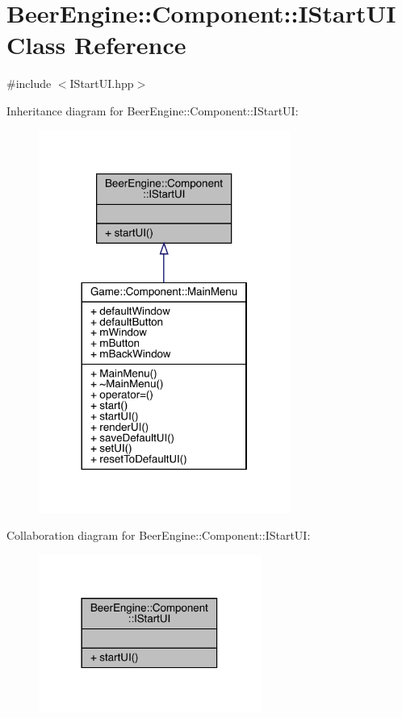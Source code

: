 \hypertarget{class_beer_engine_1_1_component_1_1_i_start_u_i}{}\section{Beer\+Engine\+:\+:Component\+:\+:I\+Start\+UI Class Reference}
\label{class_beer_engine_1_1_component_1_1_i_start_u_i}


{\ttfamily \#include $<$I\+Start\+U\+I.\+hpp$>$}



Inheritance diagram for Beer\+Engine\+:\+:Component\+:\+:I\+Start\+UI\+:\nopagebreak
\begin{figure}[H]
\begin{center}
\leavevmode
\includegraphics[width=233pt]{class_beer_engine_1_1_component_1_1_i_start_u_i__inherit__graph}
\end{center}
\end{figure}


Collaboration diagram for Beer\+Engine\+:\+:Component\+:\+:I\+Start\+UI\+:\nopagebreak
\begin{figure}[H]
\begin{center}
\leavevmode
\includegraphics[width=206pt]{class_beer_engine_1_1_component_1_1_i_start_u_i__coll__graph}
\end{center}
\end{figure}
